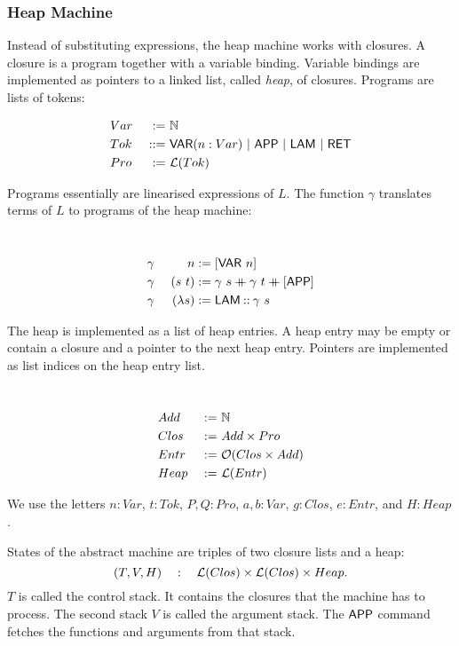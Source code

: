 \subsubsection{Heap Machine}
\label{sec:heap-def}

Instead of substituting expressions, the heap machine works with closures.  A closure is a program together with a variable binding.  Variable
bindings are implemented as pointers to a linked list, called \emph{heap}, of closures.  Programs are lists of tokens:
\begin{definition}[Program]
  \label{def:Tok}
  \begin{alignat*}{2}
    &Var  &~:=~& \mathbb{N} \\
    &Tok  &~::=~& \mathsf{VAR}(n:Var) ~|~ \mathsf{APP} ~|~ \mathsf{LAM} ~|~ \mathsf{RET} \\
    &Pro  &~:=~& \mathcal{L}(Tok)
  \end{alignat*}
\end{definition}

Programs essentially are linearised expressions of $L$.  The function $\gamma$ translates terms of $L$ to programs of the heap machine:
\begin{definition}
  ~
  \begin{alignat*}{2}
    &\gamma&~n           &:= [\mathsf{VAR}~n] \\
    &\gamma&~(s~t)       &:= \gamma~s \mathbin{+\mkern-10mu+} \gamma~t \mathbin{+\mkern-10mu+} [\mathsf{APP}] \\
    &\gamma&~(\lambda s) &:= \mathsf{LAM} \mathbin{::} \gamma~s
  \end{alignat*}
\end{definition}

The heap is implemented as a list of heap entries.  A heap entry may be empty or contain a closure and a pointer to the next heap entry.  Pointers are
implemented as list indices on the heap entry list.
\begin{definition}
  \label{def:Heap}
  ~
  \begin{alignat*}{2}
    &Add  &~:=~& \mathbb{N} \\
    &Clos &~:=~& Add \times Pro \\
    &Entr &~:=~& \mathcal{O}(Clos \times Add) \\
    &Heap &~:=~& \mathcal{L}(Entr)
  \end{alignat*}
\end{definition}
We use the letters $n:Var$, $t:Tok$, $P,Q:Pro$, $a,b:Var$, $g:Clos$, $e:Entr$, and $H:Heap$.

States of the abstract machine are triples of two closure lists and a heap:
\[
  (T, V, H) \quad:\quad \mathcal{L}(Clos) \times \mathcal{L}(Clos) \times Heap.
\]
$T$ is called the control stack.  It contains the closures that the machine has to process.  The second stack $V$ is called the argument stack.  The
$\mathsf{APP}$ command fetches the functions and arguments from that stack.


